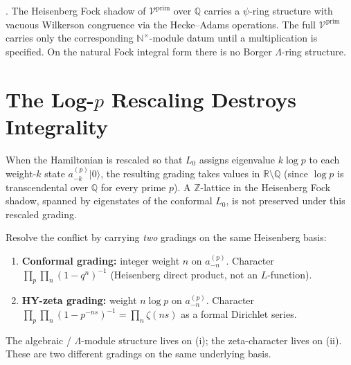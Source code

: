\begin{theorem}
\label{v4-arith:thm:corrected-lambda-form}
\ClaimStatusProvedHere. The Heisenberg Fock shadow of
\(\mathcal{V}^{\mathrm{prim}}\) over \(\mathbb{Q}\) carries a
\(\psi\)-ring structure with vacuous Wilkerson congruence via the
Hecke--Adams operations. The full
\(\mathcal{V}^{\mathrm{prim}}\) carries only the corresponding
\(\mathbb{N}^{\times}\)-module datum until a multiplication is specified.
On the natural Fock integral form there is no Borger
\(\Lambda\)-ring structure.
\end{theorem}

\section{The Log-\(p\) Rescaling Destroys Integrality}
\label{v4-arith:gb:log-p-destroys-integrality}

\begin{observation}
\label{v4-arith:obs:logp-destroys-integrality}
When the Hamiltonian is rescaled so that \(L_{0}\) assigns eigenvalue
\(k\log p\) to each weight-\(k\) state \(a^{(p)}_{-k}|0\rangle\),
the resulting grading takes values in \(\mathbb{R}\setminus\mathbb{Q}\)
(since \(\log p\) is transcendental over \(\mathbb{Q}\) for every prime
\(p\)). A \(\mathbb{Z}\)-lattice in the Heisenberg Fock shadow, spanned
by eigenstates of the conformal \(L_{0}\), is not preserved
under this rescaled grading.
\end{observation}

\begin{convention}
\label{v4-arith:conv:two-grading}
Resolve the conflict by carrying \emph{two} gradings on the same
Heisenberg basis:
\begin{enumerate}
\item \textbf{Conformal grading:} integer weight \(n\) on
\(a^{(p)}_{-n}\). Character \(\prod_{p}\prod_{n}(1-q^{n})^{-1}\)
(Heisenberg direct product, not an \(L\)-function).
\item \textbf{HY-zeta grading:} weight \(n\log p\) on
\(a^{(p)}_{-n}\). Character
\(\prod_{p}\prod_{n}(1-p^{-ns})^{-1}=\prod_{n}\zeta(ns)\) as a
formal Dirichlet series.
\end{enumerate}
The algebraic / \(\Lambda\)-module structure lives on (i); the
zeta-character lives on (ii). These are two different gradings on
the same underlying basis.
\end{convention}

